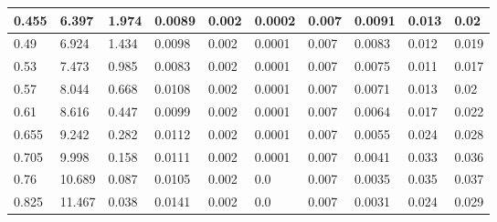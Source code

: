\begin{sidewaystable}[]
\begin{tabular}{|p{1cm}|p{1cm}|p{1.5cm}|p{1.5cm}|p{2cm}|p{2cm}|p{1.5cm}|p{1.5cm}|p{2.5cm}|p{2.5cm}|}
		0.455 & 6.397  & 1.974         & 0.0089            & 0.002              & 0.0002               & 0.007              & 0.0091                & 0.013             & 0.02                \\ \hline
		0.49  & 6.924  & 1.434         & 0.0098            & 0.002              & 0.0001               & 0.007              & 0.0083                & 0.012             & 0.019               \\ \hline
		0.53  & 7.473  & 0.985         & 0.0083            & 0.002              & 0.0001               & 0.007              & 0.0075                & 0.011             & 0.017               \\ \hline
		0.57  & 8.044  & 0.668         & 0.0108            & 0.002              & 0.0001               & 0.007              & 0.0071                & 0.013             & 0.02                \\ \hline
		0.61  & 8.616  & 0.447         & 0.0099            & 0.002              & 0.0001               & 0.007              & 0.0064                & 0.017             & 0.022               \\ \hline
		0.655 & 9.242  & 0.282         & 0.0112            & 0.002              & 0.0001               & 0.007              & 0.0055                & 0.024             & 0.028               \\ \hline
		0.705 & 9.998  & 0.158         & 0.0111            & 0.002              & 0.0001               & 0.007              & 0.0041                & 0.033             & 0.036               \\ \hline
		0.76  & 10.689 & 0.087         & 0.0105            & 0.002              & 0.0                  & 0.007              & 0.0035                & 0.035             & 0.037               \\ \hline
		0.825 & 11.467 & 0.038         & 0.0141            & 0.002              & 0.0                  & 0.007              & 0.0031                & 0.024             & 0.029               \\ \hline
	\end{tabular}
\end{sidewaystable}


